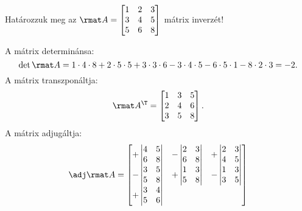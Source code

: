 \documentclass[a4paper, 12pt]{scrartcl}
\begin{document}
\begin{example}
  Határozzuk meg az $\rmat A = \begin{bmatrix}
      1 & 2 & 3 \\
      3 & 4 & 5 \\
      5 & 6 & 8 \\
    \end{bmatrix}$ mátrix inverzét!

  A mátrix determinánsa:
  $$
    \det \rmat A
    = 1 \cdot 4 \cdot 8
    + 2 \cdot 5 \cdot 5
    + 3 \cdot 3 \cdot 6
    - 3 \cdot 4 \cdot 5
    - 6 \cdot 5 \cdot 1
    - 8 \cdot 2 \cdot 3
    = -2
    \text.
  $$
  A mátrix transzponáltja:
  $$
    \rmat A^\T = \begin{bmatrix}
      1 & 3 & 5 \\
      2 & 4 & 6 \\
      3 & 5 & 8
    \end{bmatrix}
    \text.
  $$
  A mátrix adjugáltja:
  $$
    \adj \rmat A = \begin{bmatrix}
      + \begin{vmatrix}
          4 & 5 \\
          6 & 8
        \end{vmatrix}
       &
      - \begin{vmatrix}
          2 & 3 \\
          6 & 8
        \end{vmatrix}
       &
      + \begin{vmatrix}
          2 & 3 \\
          4 & 5
        \end{vmatrix}
      \\
      - \begin{vmatrix}
          3 & 5 \\
          5 & 8
        \end{vmatrix}
       &
      + \begin{vmatrix}
          1 & 3 \\
          5 & 8
        \end{vmatrix}
       &
      - \begin{vmatrix}
          1 & 3 \\
          3 & 5
        \end{vmatrix}
      \\
      + \begin{vmatrix}
          3 & 4 \\
          5 & 6
        \end{vmatrix}

\end{bmatrix}$$
\end{example}
\end{document}
